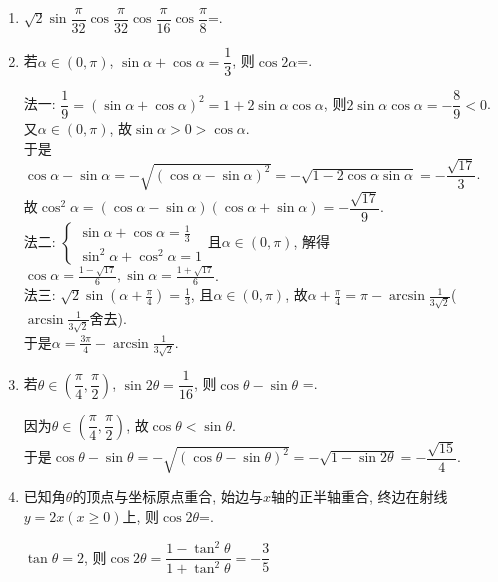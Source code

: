 \begin{enumerate}
    \item $\sqrt{2}\sin\dfrac{\pi}{32}\cos\dfrac{\pi}{32}\cos\dfrac{\pi}{16}\cos\dfrac{\pi}{8}$=. 
    
    \item 若$\alpha\in(0,\pi)$, $\sin\alpha+\cos\alpha=\dfrac{1}{3}$, 则$\cos2\alpha$=. 
    \begin{jieda}
    法一: $\dfrac{1}{9}=(\sin\alpha+\cos\alpha)^2=1+2\sin\alpha\cos\alpha$, 则$2\sin\alpha\cos\alpha=-\dfrac{8}{9}<0$. \\
    又$\alpha\in(0,\pi)$, 故$\sin\alpha>0>\cos\alpha$. \\
    于是$\cos\alpha-\sin\alpha=-\sqrt{(\cos\alpha-\sin\alpha)^2}=-\sqrt{1-2\cos\alpha\sin\alpha}=-\dfrac{\sqrt{17}}{3}$. \\
    故$\cos^2\alpha=(\cos\alpha-\sin\alpha)(\cos\alpha+\sin\alpha)=-\dfrac{\sqrt{17}}{9}$. \\
    法二: $\begin{cases}
    \sin\alpha+\cos\alpha=\frac{1}{3}\\
    \sin^2\alpha+\cos^2\alpha=1
    \end{cases}$且$\alpha\in(0,\pi)$, 解得$\cos\alpha=\frac{1-\sqrt{17}}{6},\sin\alpha=\frac{1+\sqrt{17}}{6}$. \\
    法三: $\sqrt{2}\sin(\alpha+\frac{\pi}{4})=\frac{1}{3}$, 且$\alpha\in(0,\pi)$, 
    故$\alpha+\frac{\pi}{4}=\pi-\arcsin\frac{1}{3\sqrt{2}}$($\arcsin\frac{1}{3\sqrt{2}}$舍去).\\
    于是$\alpha=\frac{3\pi}{4}-\arcsin\frac{1}{3\sqrt{2}}$. 
    \end{jieda}
    
    \item 若$\theta\in\left(\dfrac{\pi}{4},\dfrac{\pi}{2}\right)$, $\sin2\theta=\dfrac{1}{16}$, 则$\cos\theta-\sin\theta$ =. 
    \begin{jieda}
    因为$\theta\in\left(\dfrac{\pi}{4},\dfrac{\pi}{2}\right)$, 故$\cos\theta<\sin\theta$. \\
    于是$\cos\theta-\sin\theta=-\sqrt{(\cos\theta-\sin\theta)^2}=-\sqrt{1-\sin2\theta}=-\dfrac{\sqrt{15}}{4}$. 
    \end{jieda}
    \item 已知角$\theta$的顶点与坐标原点重合, 始边与$x$轴的正半轴重合, 终边在射线$y=2x(x\geq 0)$上, 则$\cos2\theta$=. 
    \begin{jieda}
    $\tan\theta=2$, 则$\cos2\theta=\dfrac{1-\tan^2\theta}{1+\tan^2\theta}=-\dfrac{3}{5}$
    \end{jieda}
    

\end{enumerate}

